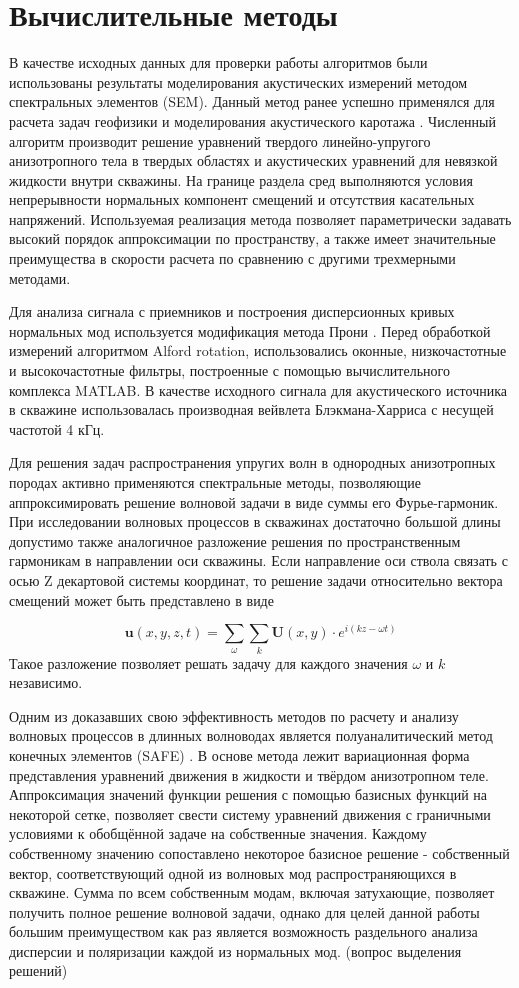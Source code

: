 \documentclass[a4paper,11pt]{article}
\begin{document}
\section{Вычислительные методы}

В качестве исходных данных для проверки работы алгоритмов были использованы результаты моделирования акустических измерений методом спектральных элементов (SEM). Данный метод ранее успешно применялся для расчета задач геофизики \cite{Komatitsch1999} и моделирования акустического каротажа \cite{Charara2011}. Численный алгоритм производит решение уравнений твердого линейно-упругого анизотропного тела в твердых областях и акустических уравнений для невязкой жидкости внутри скважины. На границе раздела сред выполняются условия непрерывности нормальных компонент смещений и отсутствия касательных напряжений. Используемая реализация метода позволяет параметрически задавать высокий порядок аппроксимации по пространству, а также имеет значительные преимущества в скорости расчета по сравнению с другими трехмерными методами.

Для анализа сигнала с приемников и построения дисперсионных кривых нормальных мод используется модификация метода Прони \cite{Ekstrom1995}. Перед обработкой измерений алгоритмом Alford rotation, использовались оконные, низкочастотные и высокочастотные фильтры, построенные с помощью вычислительного комплекса MATLAB. В качестве исходного сигнала для акустического источника в скважине использовалась производная вейвлета Блэкмана-Харриса с несущей частотой 4 кГц. 

Для решения задач распространения упругих волн в однородных анизотропных породах активно применяются спектральные методы, позволяющие аппроксимировать решение волновой задачи в виде суммы его Фурье-гармоник. При исследовании волновых процессов в скважинах достаточно большой длины допустимо также аналогичное разложение решения по пространственным гармоникам в направлении оси скважины. Если направление оси ствола связать с осью Z декартовой системы координат, то решение задачи относительно вектора смещений может быть представлено в виде

$$
	\mathbf{u}(x,y,z,t) = \sum_{\omega} \sum_{k} \mathbf{U}(x,y)\cdot e^{i(kz - \omega t)}
$$
Такое разложение позволяет решать задачу для каждого значения $\omega$ и $k$ независимо. 

Одним из доказавших свою эффективность методов по расчету и анализу волновых процессов в длинных волноводах является полуаналитический метод конечных элементов (SAFE) \cite{Bartoli2006}. В основе метода лежит вариационная форма представления уравнений движения в жидкости и твёрдом анизотропном теле. Аппроксимация значений функции решения с помощью базисных функций на некоторой сетке, позволяет свести систему уравнений движения с граничными условиями к обобщённой задаче на собственные значения. Каждому собственному значению сопоставлено некоторое базисное решение - собственный вектор, соответствующий одной из волновых мод распространяющихся в скважине. Сумма по всем собственным модам, включая затухающие, позволяет получить полное решение волновой задачи, однако для целей данной работы большим преимуществом как раз является возможность раздельного анализа дисперсии и поляризации каждой из нормальных мод. (вопрос выделения решений)
\end{document}
